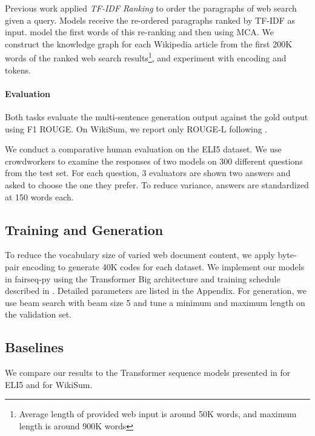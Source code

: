 \documentclass[11pt,a4paper]{article}
\begin{document}
Previous work \cite{liu2018generating} applied \textit{TF-IDF Ranking} to order the paragraphs of web search given a query. Models receive the re-ordered paragraphs ranked by TF-IDF as input. \citet{liu2018generating} model the first  words of this re-ranking and then  using MCA. We construct the knowledge graph for each Wikipedia article from the first 200K words of the ranked web search results\footnote{Average length of provided web input is around 50K words, and maximum length is around 900K words}, and experiment with encoding  and  tokens.

\paragraph{Evaluation} Both tasks evaluate the multi-sentence generation output against the gold output using F1 ROUGE. On WikiSum, we report only ROUGE-L following \cite{liu2018generating}. 

We conduct a comparative human evaluation on the ELI5 dataset. We use crowdworkers to examine the responses of two models on 300 different questions from the test set. For each question, 3 evaluators are shown two answers and asked to choose the one they prefer. To reduce variance, answers are standardized at 150 words each. 

\subsection{Training and Generation}

To reduce the vocabulary size of varied web document content, we apply byte-pair encoding \cite{sennrich2016neural} to generate 40K codes for each dataset. We implement our models in fairseq-py \cite{ott2019fairseq} using the Transformer Big architecture and training schedule described in \cite{vaswani2018attention}. Detailed parameters are listed in the Appendix. For generation, we use beam search with beam size 5 and tune a minimum and maximum length on the validation set.

\subsection{Baselines}

We compare our results to the Transformer sequence models presented in \cite{fan2019explain} for ELI5 and \cite{liu2018generating} for WikiSum. 
\end{document}
